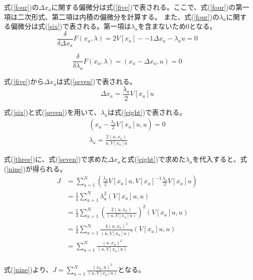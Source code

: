 \documentclass[]{jarticle}          %
\begin{document}
式(\ref{four})の$\Delta{x_a}$に関する偏微分は式(\ref{five})で表される。ここで、式(\ref{four})の第一項は二次形式、第二項は内積の偏微分を計算する。
また、式(\ref{four})の$\lambda_a$に関する偏微分は式(\ref{six})で表される。第一項は$\lambda_a$を含まないため0となる。
\begin{equation}
  \frac{\delta}{\delta\Delta{x_a}}F(x_a,\lambda)=2V[x_a]-{-1}\Delta{x_a}-\lambda_a{u}=0
  \label{five}
\end{equation}

\begin{equation}
  \frac{\delta}{\delta\lambda_a}F(x_a,\lambda)=(x_a-\Delta{x_a},u)=0
  \label{six}
\end{equation}

式(\ref{five})から$\Delta{x_a}$は式(\ref{seven})で表される。
\begin{equation}
  \Delta{x_a}=\frac{\lambda_a}{2}V[x_a]u
  \label{seven}
\end{equation}

式(\ref{six})と式(\ref{seven})を用いて、$\lambda_a$は式(\ref{eight})で表される。
\begin{equation}
  \begin{split}
  (x_a-\frac{\lambda_a}{2}V[x_a]u,u) = 0 \\
  \lambda_a = \frac{2(u,x_a)}{u,V[x_a]u}
  \end{split}
  \label{eight}
\end{equation}

式(\ref{three})に、式(\ref{seven})で求めた$\Delta{x_a}$と式(\ref{eight})で求めた$\lambda_a$を代入すると、式(\ref{nine})が得られる。
\begin{equation}
  \begin{split}
    J &= \sum_{a=1}^{N}(\frac{\lambda_a}{2}V[x_a]u,V[x_a]^{-1}\frac{\lambda_a}{2}V[x_a]u) \\
    &= \frac{1}{4}\sum_{a=1}^{N}\lambda_a^2(V[x_a]u,u) \\
    &= \frac{1}{4}\sum_{a=1}^{N}(\frac{2(u,x_a)}{(u,V[x_a]u)})^2(V[x_a]u,u) \\
    &= \frac{1}{4}\sum_{a=1}^{N}\frac{4(u,x_a)^2}{(u,V[x_a]u)^2}(V[x_a]u,u) \\
    &= \sum_{a=1}^{N}\frac{(u,x_a)^2}{(u,V[x_a]u)} \\
  \end{split}
  \label{nine}
\end{equation}

式(\ref{nine})より、$J = \sum_{a=1}^{N}\frac{(x_a,u)^2}{(u,V[x_a]u)}$となる。
\end{document}
